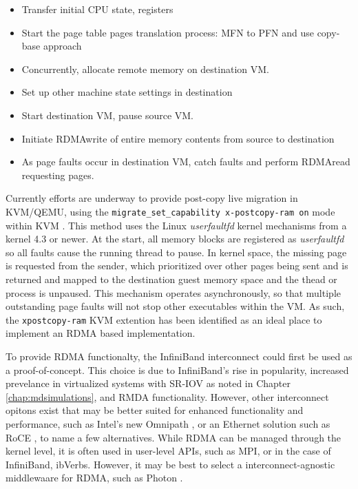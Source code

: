 \begin{itemize}
\item Transfer initial CPU state, registers
\item Start the page table pages translation process: MFN to PFN and use copy-base approach
\item Concurrently, allocate remote memory on destination VM.
\item Set up other machine state settings in destination
\item Start destination VM, pause source VM.
\item Initiate RDMAwrite of entire memory contents from source to destination
\item As page faults occur in destination VM, catch faults and perform RDMAread requesting pages. 
\end{itemize}

Currently efforts are underway to provide post-copy live migration in KVM/QEMU, using the \verb!migrate_set_capability x-postcopy-ram on! mode within KVM \cite{www-kvm-postcopy}. This method uses the Linux \emph{userfaultfd} kernel mechanisms from a kernel 4.3 or newer. At the start, all memory blocks are registered as \emph{userfaultfd} so all faults cause the running thread to pause. In kernel space, the missing page is requested from the sender, which prioritized over other pages being sent and is returned and mapped to the destination guest memory space and the thead or process is unpaused. This mechanism operates asynchronously, so that multiple outstanding page faults will not stop other executables within the VM. As such, the \verb!xpostcopy-ram! KVM extention has been identified as an ideal place to implement an RDMA based implementation. 

To provide RDMA functionalty, the InfiniBand interconnect could first be used as a proof-of-concept. This choice is due to InfiniBand's rise in popularity, increased prevelance in virtualized systems  with SR-IOV as noted in Chapter \ref{chap:mdsimulations}, and RMDA functionality. However, other interconnect opitons exist that may be better suited for enhanced functionality and performance, such as Intel's new Omnipath \cite{omnipath2015}, or an Ethernet solution such as RoCE \cite{beck2011roce}, to name a few alternatives.  While RDMA can be managed through the kernel level, it is often used in user-level APIs, such as MPI, or in the case of InfiniBand, ibVerbs. However, it may be best to select a interconnect-agnostic middlewaare for RDMA, such as Photon \cite{kissel2016photon}.



